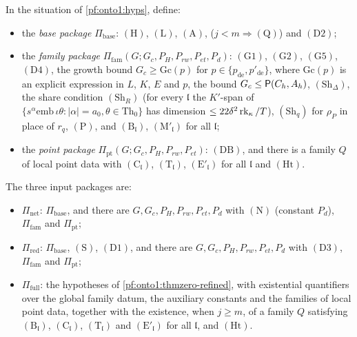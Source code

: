 \begin{definition}\label{pf:onto1:packages}
In the situation of \cref{pf:onto1:hyps}, define:
\begin{itemize}
\item the \emph{base package} $\Pi_{\mathrm{base}}$: $(\mathrm H)$, $(\mathrm L)$, $(\mathrm A)$, ($j<m\Rightarrow(\mathrm Q)$) and
$(\mathrm D2)$;
\item the \emph{family package} $\Pi_{\mathrm{fam}}(G;G_c,P_H,P_{rw},P_{et},P_d)$: $(\mathrm G1)$, $(\mathrm G2)$, $(\mathrm G5)$,
$(\mathrm D4)$, the growth bound $G_c\ge\mathrm{Gc}(p)$ for $p\in\{p_{\mathrm{de}},p'_{\mathrm{de}}\}$, where $\mathrm{Gc}(p)$ is an
explicit expression in $L$, $K$, $E$ and $p$, the bound $G_c\le\mathsf{P}(C_h,A_h)$, $(\mathrm{Sh}_\Delta)$, the share
condition $(\mathrm{Sh}_R)$ (for every $\mathfrak l$ the $K'$-span of $\{s^\alpha\mathrm{emb}\,\iota\theta:|\alpha|=a_0,\theta\in\mathrm{Th}_0\}$
has dimension $\le22\delta^2\operatorname{rk}_\kappa/T$), $(\mathrm{Sh}_q)$ for $\rho_P$ in place of $r_q$, $(\mathrm P)$, and
$(\mathrm B_{\mathfrak l})$, $(\mathrm M'_{\mathfrak l})$ for all $\mathfrak l$;
\item the \emph{point package} $\Pi_{\mathrm{pt}}(G;G_c,P_H,P_{rw},P_{et})$: $(\mathrm{DB})$, and there is a family $Q$ of local
point data with $(\mathrm C_{\mathfrak l})$, $(\mathrm T_{\mathfrak l})$, $(\mathrm E'_{\mathfrak l})$ for all $\mathfrak l$ and
$(\mathrm{Ht})$.
\end{itemize}
The three input packages are:
\begin{itemize}
\item $\Pi_{\mathrm{net}}$: $\Pi_{\mathrm{base}}$, and there are $G,G_c,P_H,P_{rw},P_{et},P_d$ with $(\mathrm N)$ (constant
$P_d$), $\Pi_{\mathrm{fam}}$ and $\Pi_{\mathrm{pt}}$;
\item $\Pi_{\mathrm{red}}$: $\Pi_{\mathrm{base}}$, $(\mathrm S)$, $(\mathrm D1)$, and there are $G,G_c,P_H,P_{rw},P_{et},P_d$ with
$(\mathrm D3)$, $\Pi_{\mathrm{fam}}$ and $\Pi_{\mathrm{pt}}$;
\item $\Pi_{\mathrm{full}}$: the hypotheses of \cref{pf:onto1:thmzero-refined}, with existential quantifiers over the
global family datum, the auxiliary constants and the families of local point data, together with the existence, when
$j\ge m$, of a family $Q$ satisfying $(\mathrm B_{\mathfrak l})$, $(\mathrm C_{\mathfrak l})$, $(\mathrm T_{\mathfrak l})$ and
$(\mathrm E'_{\mathfrak l})$ for all $\mathfrak l$, and $(\mathrm{Ht})$.
\end{itemize}
\end{definition}

